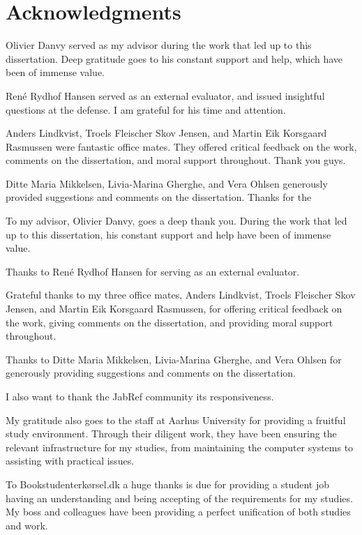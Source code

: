 \documentclass[twoside,11pt,openright,a4paper]{report}
\begin{document}
\chapter*{Acknowledgments}

Olivier Danvy served as my advisor during the work that led up to this
dissertation.  Deep gratitude goes to his constant support and help,
which have been of immense value.

René Rydhof Hansen served as an external evaluator, and issued
insightful questions at the defense.  I am grateful for his time and attention.

Anders Lindkvist, Troels Fleischer Skov Jensen, and Martin Eik
Korsgaard Rasmussen were fantastic office mates.  They offered
critical feedback on the work, comments on the dissertation, and moral
support throughout.  Thank you guys.

Ditte Maria Mikkelsen, Livia-Marina Gherghe, and Vera Ohlsen
generously provided suggestions and comments on the dissertation.
Thanks for the 



To my advisor, Olivier Danvy, goes a deep thank you.  During the work
that led up to this dissertation, his constant support and help have
been of immense value.

Thanks to René Rydhof Hansen for serving as an external evaluator.

Grateful thanks to my three office mates, Anders Lindkvist, Troels
Fleischer Skov Jensen, and Martin Eik Korsgaard Rasmussen, for
offering critical feedback on the work, giving comments on the
dissertation, and providing moral support throughout.

Thanks to Ditte Maria Mikkelsen, Livia-Marina Gherghe, and Vera Ohlsen
for generously providing suggestions and comments on the dissertation.

I also want to thank the JabRef community its responsiveness.

My gratitude also goes to the staff at Aarhus University for providing
a fruitful study environment.  Through their diligent work, they have
been ensuring the relevant infrastructure for my studies, from
maintaining the computer systems to assisting with practical issues.

To Bookstudenterkørsel.dk a huge thanks is due for providing a student
job having an understanding and being accepting of the requirements for
my studies.  My boss and colleagues have been providing a perfect
unification of both studies and work.
\end{document}
